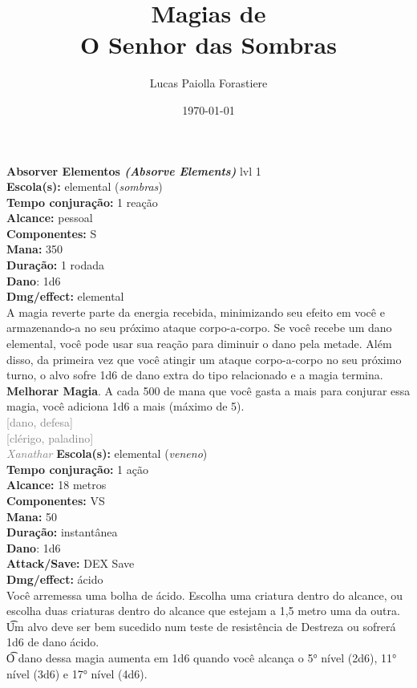 \documentclass{RPG_Adventure}[2021/10/20]
\title{Magias de\\ \Huge{O Senhor das Sombras}}
\date{\today}
\author{Lucas Paiolla Forastiere}
\begin{document}
\maketitle

{\normalsize \textbf{Absorver Elementos \textit{(Absorve Elements)}} lvl 1\\}
{\small \t \textbf{Escola(s):} elemental (\textit{sombras})\\\t \textbf{Tempo conjuração:} 1 reação\\\t \textbf{Alcance:} pessoal\\\t \textbf{Componentes:} S\\\t \textbf{Mana:} 350\\\t \textbf{Duração:} 1 rodada\\\t \textbf{Dano}: 1d6\\\t \textbf{Dmg/effect:} elemental\\}
{\normalsize A magia reverte parte da energia recebida, minimizando seu efeito em você e armazenando-a no seu próximo ataque corpo-a-corpo. Se você recebe um dano elemental, você pode usar sua reação para diminuir o dano pela metade. Além disso, da primeira vez que você atingir um ataque corpo-a-corpo no seu próximo turno, o alvo sofre 1d6 de dano extra do tipo relacionado e a magia termina.\\\t \textbf{Melhorar Magia}. A cada 500 de mana que você gasta a mais para conjurar essa magia, você adiciona 1d6 a mais (máximo de 5).\\}
{\scriptsize \textcolor{gray}{[dano, defesa]\\}}
{\scriptsize \textcolor{gray}{[clérigo, paladino]\\}}
{\tiny \textcolor{gray}{\textit{Xanathar}}}
{\small \t \textbf{Escola(s):} elemental (\textit{veneno})\\\t \textbf{Tempo conjuração:} 1 ação\\\t \textbf{Alcance:} 18 metros\\\t \textbf{Componentes:} VS\\\t \textbf{Mana:} 50\\\t \textbf{Duração:} instantânea\\\t \textbf{Dano}: 1d6\\\t \textbf{Attack/Save:} DEX Save\\\t \textbf{Dmg/effect:} ácido\\}
{\normalsize Você arremessa uma bolha de ácido. Escolha uma criatura dentro do alcance, ou escolha duas criaturas dentro do alcance que estejam a 1,5 metro uma da outra.\\\t Um alvo deve ser bem sucedido num teste de resistência de Destreza ou sofrerá 1d6 de dano ácido.\\\t O dano dessa magia aumenta em 1d6 quando você alcança o 5° nível (2d6), 11° nível (3d6) e 17° nível (4d6).\\}
\end{document}
